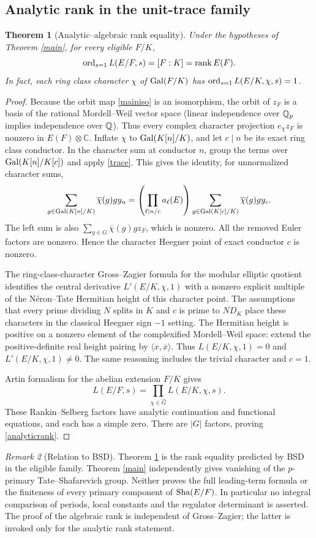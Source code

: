 \documentclass[11pt,a4paper]{article}
\newtheorem{theorem}{Theorem}[section]\newtheorem{proposition}[theorem]{Proposition}\newtheorem{lemma}[theorem]{Lemma}\newtheorem{corollary}[theorem]{Corollary}\theoremstyle{definition}\newtheorem{definition}[theorem]{Definition}\theoremstyle{remark}\newtheorem{remark}[theorem]{Remark}
\numberwithin{equation}{section}
\begin{document}
\subsection{Analytic rank in the unit-trace family}
\begin{theorem}[Analytic--algebraic rank equality]\label{gzrank}
Under the hypotheses of Theorem \ref{main}, for every eligible $F/K$,
\begin{equation}\label{analyticrank}
\operatorname{ord}_{s=1}L(E/F,s)=[F:K]=\operatorname{rank} E(F).
\end{equation}
In fact, each ring class character $\chi$ of $\operatorname{Gal}(F/K)$ has $\operatorname{ord}_{s=1}L(E/K,\chi,s)=1$.
\end{theorem}
\begin{proof}
Because the orbit map \eqref{mainiso} is an isomorphism, the orbit of $z_F$ is a basis of the rational Mordell--Weil vector space (linear independence over $\mathbb Q_p$ implies independence over $\mathbb Q$). Thus every complex character projection $e_\chi z_F$ is nonzero in $E(F)\otimes\mathbb C$. Inflate $\chi$ to $\operatorname{Gal}(K[n]/K)$, and let $c\mid n$ be its exact ring class conductor. In the character sum at conductor $n$, group the terms over $\operatorname{Gal}(K[n]/K[c])$ and apply \eqref{trace}. This gives the identity, for unnormalized character sums,
\[ \sum_{g\in\operatorname{Gal}(K[n]/K)}\overline\chi(g)g y_n
=\left(\prod_{\ell\mid n/c}a_\ell(E)\right)
\sum_{g\in\operatorname{Gal}(K[c]/K)}\overline\chi(g)g y_c. \]
The left sum is also $\sum_{g\in G}\overline\chi(g)g z_F$, which is nonzero. All the removed Euler factors are nonzero. Hence the character Heegner point of exact conductor $c$ is nonzero.

The ring-class-character Gross--Zagier formula for the modular elliptic quotient \cite{GZ,Zhang} identifies the central derivative $L'(E/K,\chi,1)$ with a nonzero explicit multiple of the N\'eron--Tate Hermitian height of this character point. The assumptions that every prime dividing $N$ splits in $K$ and $c$ is prime to $ND_K$ place these characters in the classical Heegner sign $-1$ setting. The Hermitian height is positive on a nonzero element of the complexified Mordell--Weil space: extend the positive-definite real height pairing by $\langle x,\overline x\rangle$. Thus $L(E/K,\chi,1)=0$ and $L'(E/K,\chi,1)\ne0$. The same reasoning includes the trivial character and $c=1$.

Artin formalism for the abelian extension $F/K$ gives
\[ L(E/F,s)=\prod_{\chi\in\widehat G}L(E/K,\chi,s). \]
These Rankin--Selberg factors have analytic continuation and functional equations, and each has a simple zero. There are $|G|$ factors, proving \eqref{analyticrank}.
\end{proof}
\begin{remark}[Relation to BSD]
Theorem \ref{gzrank} is the rank equality predicted by BSD in the eligible family. Theorem \ref{main} independently gives vanishing of the $p$-primary Tate--Shafarevich group. Neither proves the full leading-term formula or the finiteness of every primary component of $\operatorname{Sha}(E/F)$. In particular no integral comparison of periods, local constants and the regulator determinant is asserted. The proof of the algebraic rank is independent of Gross--Zagier; the latter is invoked only for the analytic rank statement.
\end{remark}
\end{document}
